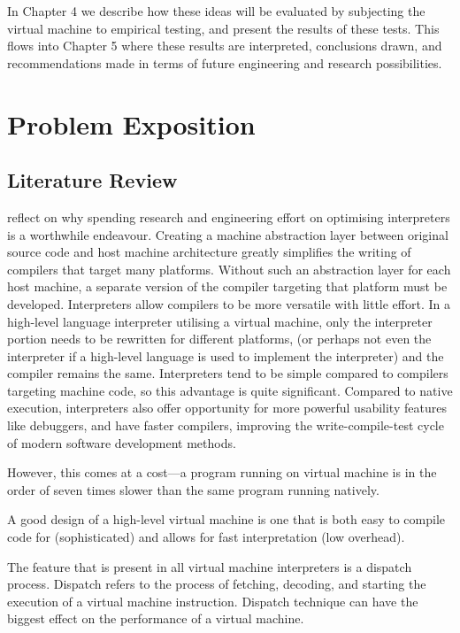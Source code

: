 		In Chapter 4 we describe how these ideas will be evaluated by subjecting the virtual machine to empirical testing, and present the results of these tests. This flows into Chapter 5 where these results are interpreted, conclusions drawn, and recommendations made in terms of future engineering and research possibilities.

\chapter{Problem Exposition}
	\section{Literature Review}
		\cite{structureinterpreters} reflect on why spending research and engineering effort on optimising interpreters is a worthwhile endeavour. Creating a machine abstraction layer between original source code and host machine architecture greatly simplifies the writing of compilers that target many platforms. Without such an abstraction layer for each host machine, a separate version of the compiler targeting that platform must be developed. Interpreters allow compilers to be more versatile with little effort. In a high-level language interpreter utilising a virtual machine, only the interpreter portion needs to be rewritten for different platforms, (or perhaps not even the interpreter if a high-level language is used to implement the interpreter) and the compiler remains the same. Interpreters tend to be simple compared to compilers targeting machine code, so this advantage is quite significant. Compared to native execution, interpreters also offer opportunity for more powerful usability features like debuggers, and have faster compilers, improving the write-compile-test cycle of modern software development methods.
		
		However, this comes at a cost---a program running on virtual machine is in the order of seven times slower than the same program running natively.
		
		A good design of a high-level virtual machine is one that is both easy to compile code for (sophisticated) and allows for fast interpretation (low overhead).
		
		The feature that is present in all virtual machine interpreters is a dispatch process. Dispatch refers to the process of fetching, decoding, and starting the execution of a virtual machine instruction. Dispatch technique can have the biggest effect on the performance of a virtual machine.
		
